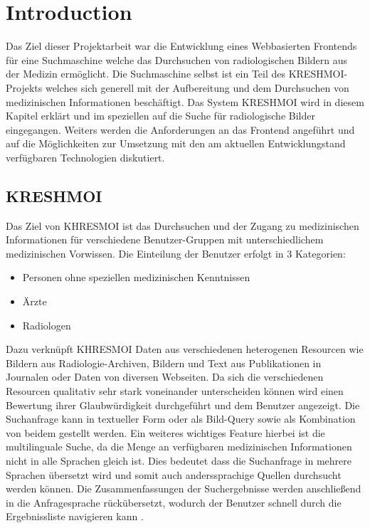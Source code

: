 \section{Introduction}
\label{sec:introduction}
Das Ziel dieser Projektarbeit war die Entwicklung eines Webbasierten Frontends für eine Suchmaschine welche das Durchsuchen von radiologischen Bildern aus der Medizin ermöglicht.
Die Suchmaschine selbst ist ein Teil des KRESHMOI-Projekts welches sich generell mit der Aufbereitung und dem Durchsuchen von medizinischen Informationen beschäftigt.
Das System KRESHMOI wird in diesem Kapitel erklärt und im speziellen auf die Suche für radiologische Bilder eingegangen.
Weiters werden die Anforderungen an das Frontend angeführt und auf die Möglichkeiten zur Umsetzung mit den am aktuellen Entwicklungstand verfügbaren Technologien diskutiert.

\subsection{KRESHMOI}
\label{sec:Motivation}

Das Ziel von KHRESMOI ist das Durchsuchen und der Zugang zu medizinischen Informationen für verschiedene Benutzer-Gruppen mit unterschiedlichem medizinischen Vorwissen.
Die Einteilung der Benutzer erfolgt in 3 Kategorien:
\begin{itemize}
	\item Personen ohne speziellen medizinischen Kenntnissen
	\item Ärzte
	\item Radiologen
\end{itemize}
Dazu verknüpft KHRESMOI Daten aus verschiedenen heterogenen Resourcen wie Bildern aus Radiologie-Archiven, Bildern und Text aus Publikationen in Journalen oder Daten von diversen Webseiten.
Da sich die verschiedenen Resourcen qualitativ sehr stark voneinander unterscheiden können wird einen Bewertung ihrer Glaubwürdigkeit durchgeführt und dem Benutzer angezeigt.
Die Suchanfrage kann in textueller Form oder als Bild-Query sowie als Kombination von beidem gestellt werden.
Ein weiteres wichtiges Feature hierbei ist die multilinguale Suche, da die Menge an verfügbaren medizinischen Informationen nicht in alle Sprachen gleich ist.
Dies bedeutet dass die Suchanfrage in mehrere Sprachen übersetzt wird und somit auch anderssprachige Quellen durchsucht werden können.
Die Zusammenfassungen der Suchergebnisse werden anschließend in die Anfragesprache rückübersetzt, 
wodurch der Benutzer schnell durch die Ergebnissliste navigieren kann \cite{kres}.

